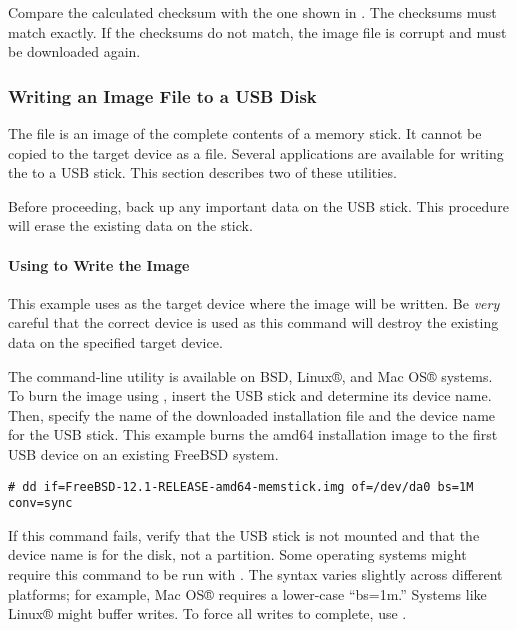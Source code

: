 Compare the calculated checksum with the one shown in .
The checksums must match exactly.
If the checksums do not match, the image file is corrupt and must be downloaded again.

\subsubsection{Writing an Image File to a USB Disk}
\label{sec:writing-image-to-usb}

The  file is an image of the complete contents of a memory stick.
It cannot be copied to the target device as a file.
Several applications are available for writing the  to a USB stick.
This section describes two of these utilities.

\begin{important}
Before proceeding, back up any important data on the USB stick.
This procedure will erase the existing data on the stick.
\end{important}

\paragraph{Using  to Write the Image}
\begin{warning}
This example uses  as the target device where the image will be written.
Be \emph{very} careful that the correct device is used as this command will destroy the existing data on the specified target device.
\end{warning}

The  command-line utility is available on BSD, Linux®, and Mac OS® systems.
To burn the image using , insert the USB stick and determine its device name.
Then, specify the name of the downloaded installation file and the device name for the USB stick.
This example burns the amd64 installation image to the first USB device on an existing FreeBSD system.
\begin{lstlisting}
# dd if=FreeBSD-12.1-RELEASE-amd64-memstick.img of=/dev/da0 bs=1M conv=sync
\end{lstlisting}
If this command fails, verify that the USB stick is not mounted and that the device name is for the disk, not a partition.
Some operating systems might require this command to be run with .
The  syntax varies slightly across different platforms; for example, Mac OS® requires a lower-case ``bs=1m.''
Systems like Linux® might buffer writes.
To force all writes to complete, use .

